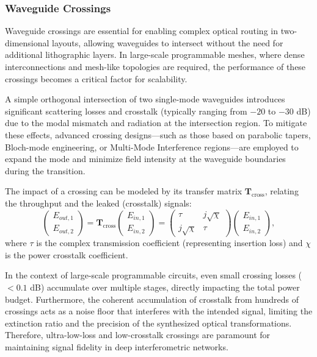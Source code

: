 \subsubsection*{Waveguide Crossings}

Waveguide crossings are essential for enabling complex optical routing in two-dimensional layouts, 
allowing waveguides to intersect without the need for additional lithographic layers. In 
large-scale programmable meshes, where dense interconnections and mesh-like topologies are 
required, the performance of these crossings becomes a critical factor for scalability.

A simple orthogonal intersection of two single-mode waveguides introduces significant scattering 
losses and crosstalk (typically ranging from $-20$ to $-30$ dB) due to the modal mismatch and 
radiation at the intersection region. To mitigate these effects, advanced crossing designs—such as 
those based on parabolic tapers, Bloch-mode engineering, or Multi-Mode Interference regions—are 
employed to expand the mode and minimize field intensity at the waveguide boundaries during the 
transition.

The impact of a crossing can be modeled by its transfer matrix $\mathbf{T}_{\text{cross}}$, 
relating the throughput and the leaked (crosstalk) signals:
\begin{equation}
\begin{pmatrix} E_{out,1} \\ E_{out,2} \end{pmatrix} = \mathbf{T}_{\text{cross}} \begin{pmatrix} 
    E_{in,1} \\ E_{in,2} \end{pmatrix} = \begin{pmatrix} \tau & j\sqrt{\chi} \\ j\sqrt{\chi} & \tau 
    \end{pmatrix} \begin{pmatrix} E_{in,1} \\ E_{in,2} \end{pmatrix},
\label{eq:matrix_crossing}
\end{equation}
where $\tau$ is the complex transmission coefficient (representing insertion loss) and $\chi$ is 
the power crosstalk coefficient. 

In the context of large-scale programmable circuits, even small crossing losses ($<0.1$ dB) 
accumulate over multiple stages, directly impacting the total power budget. Furthermore, the 
coherent accumulation of crosstalk from hundreds of crossings acts as a noise floor that 
interferes with the intended signal, limiting the extinction ratio and the precision of the 
synthesized optical transformations. Therefore, ultra-low-loss and low-crosstalk crossings are 
paramount for maintaining signal fidelity in deep interferometric networks.


